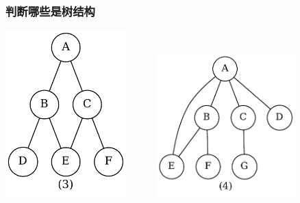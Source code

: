 \begin{frame}[fragile]
  \frametitle{判断哪些是树结构}
  \includegraphics[width=0.35\textwidth]{dot/tree-judge3.pdf} ~~~~~
  \pause
  \includegraphics[width=0.4\textwidth]{dot/tree-judge4.pdf}
\end{frame}

